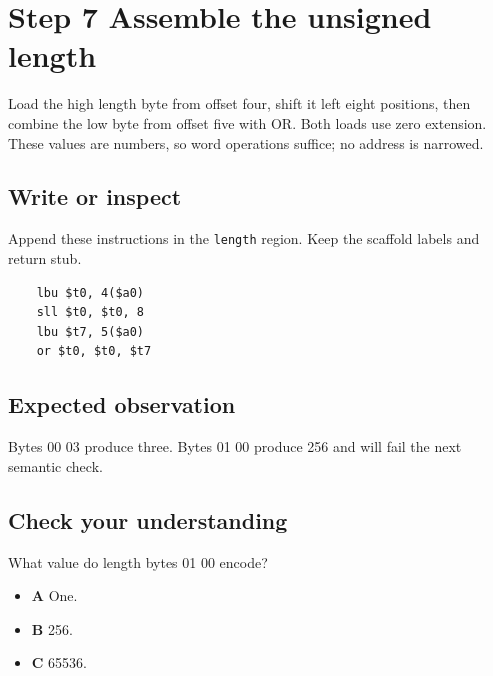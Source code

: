 \section{Step 7 Assemble the unsigned length}\label{packet-s07}

Load the high length byte from offset four, shift it left eight positions, then combine the low byte from offset five with OR. Both loads use zero extension. These values are numbers, so word operations suffice; no address is narrowed.

\subsection{Write or inspect}
Append these instructions in the \texttt{length} region. Keep the scaffold labels and return stub.

\begin{verbatim}
    lbu $t0, 4($a0)
    sll $t0, $t0, 8
    lbu $t7, 5($a0)
    or $t0, $t0, $t7
\end{verbatim}

\subsection{Expected observation}
Bytes 00 03 produce three. Bytes 01 00 produce 256 and will fail the next semantic check.

\subsection{Check your understanding}
What value do length bytes 01 00 encode?

\begin{itemize}
  \item \textbf{A} One.
  \item \textbf{B} 256.
  \item \textbf{C} 65536.
\end{itemize}
